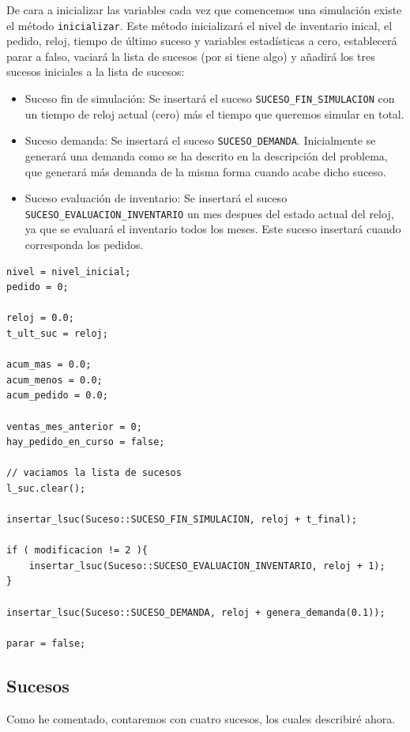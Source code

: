 \documentclass[12pt, spanish]{article}
\begin{document}
De cara a inicializar las variables cada vez que comencemos una simulación existe el método \texttt{inicializar}. Este método inicializará el nivel de inventario inical, el pedido, reloj, tiempo de último suceso y variables estadísticas a cero, establecerá parar a falso, vaciará la lista de sucesos (por si tiene algo) y añadirá los tres sucesos iniciales a la lista de sucesos:

\begin{itemize}
	\item Suceso fin de simulación: Se insertará el suceso \texttt{SUCESO\_FIN\_SIMULACION} con un tiempo de reloj actual (cero) más el tiempo que queremos simular en total.
	\item Suceso demanda: Se insertará el suceso \texttt{SUCESO\_DEMANDA}. Inicialmente se generará una demanda como se ha descrito en la descripción del problema, que generará más demanda de la misma forma cuando acabe dicho suceso.
	\item Suceso evaluación de inventario: Se insertará el suceso \texttt{SUCESO\_EVALUACION\_INVENTARIO} un mes despues del estado actual del reloj, ya que se evaluará el inventario todos los meses. Este suceso insertará cuando corresponda los pedidos.
\end{itemize}

\begin{lstlisting}
nivel = nivel_inicial;
pedido = 0;

reloj = 0.0;
t_ult_suc = reloj;

acum_mas = 0.0;
acum_menos = 0.0;
acum_pedido = 0.0;

ventas_mes_anterior = 0;
hay_pedido_en_curso = false;

// vaciamos la lista de sucesos
l_suc.clear();

insertar_lsuc(Suceso::SUCESO_FIN_SIMULACION, reloj + t_final);

if ( modificacion != 2 ){
	insertar_lsuc(Suceso::SUCESO_EVALUACION_INVENTARIO, reloj + 1);
}

insertar_lsuc(Suceso::SUCESO_DEMANDA, reloj + genera_demanda(0.1));

parar = false;
\end{lstlisting}

\subsection{Sucesos}

Como he comentado, contaremos con cuatro sucesos, los cuales describiré ahora.
\end{document}
